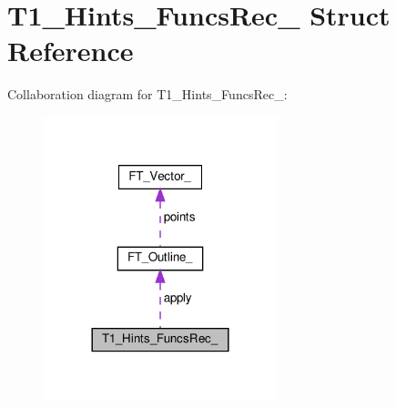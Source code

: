 \hypertarget{structT1__Hints__FuncsRec__}{}\section{T1\+\_\+\+Hints\+\_\+\+Funcs\+Rec\+\_\+ Struct Reference}
\label{structT1__Hints__FuncsRec__}


Collaboration diagram for T1\+\_\+\+Hints\+\_\+\+Funcs\+Rec\+\_\+\+:
\nopagebreak
\begin{figure}[H]
\begin{center}
\leavevmode
\includegraphics[width=192pt]{structT1__Hints__FuncsRec____coll__graph}
\end{center}
\end{figure}
